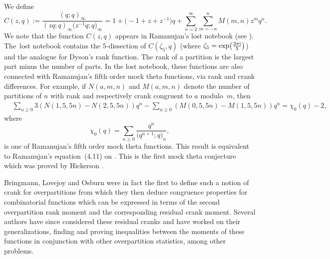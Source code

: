 \documentclass[10pt,a4paper]{amsart}
\numberwithin{equation}{section}
\begin{document}
We define
\begin{equation*}%
C(z,q) :=\dfrac{(q;q)_{\infty}}{(zq;q)_{\infty}\bigl(z^{-1}q;q\bigr)_{\infty}}
=1+\bigl(-1+z+z^{-1}\bigr)q+\sum_{n=2}^\infty \sum_{m=-n}^n M(m,n)z^mq^n.
\end{equation*}%
We note that the function $C(z,q)$ appears in Ramanujan's lost notebook (see \cite{Ga86,Ga88b,Ga88}). The~lost notebook contains the $5$-dissection of $C(\zeta_5,q)$ \big(where $\zeta_5=\exp\bigl(\frac{2\pi {\rm i}}{5}\bigr)$\big) and the analogue for Dyson's rank function. The rank of a partition is the largest part minus the number of parts. In the lost notebook, these functions are also connected with Ramanujan's fifth order mock theta functions, via rank and crank differences. For example, if $N(a,m,n)$ and $M(a,m,n)$ denote the number of partitions of $n$ with rank and respectively crank congruent to $a$ modulo~$m$, then
\begin{align*}
&{}\sum_{n\geq 0}3(N(1,5,5n)-N(2,5,5n))q^n-\sum_{n\geq 0}(M(0,5,5n)-M(1,5,5n))q^n
=\chi_0(q)-2,
\end{align*}
where
\begin{equation*}%
\chi_0(q)=\sum\limits_{n\geq 0}\frac{q^n}{\bigl(q^{n+1};q\bigr)_{n}},
\end{equation*}%
is one of Ramanujan's fifth order mock theta functions. This result is equivalent to Ramanujan's equation~(4.11) on \cite[p.~36]{Ga88b}. This is the first mock theta conjecture \cite{An-Ga89} which was proved by Hickerson \cite{Hi}.

Bringmann, Lovejoy and Osburn \cite{Br-Lo-Os} were in fact the first to define such a notion of crank for overpartitions from which they then deduce congruence properties for combinatorial functions which can be expressed in terms of the second overpartition rank moment and the corresponding residual crank moment. Several authors have since considered these residual cranks and have worked on their generalizations, finding and proving inequalities between the moments of these functions in conjunction with other overpartition statistics, among other problems.
\end{document}
